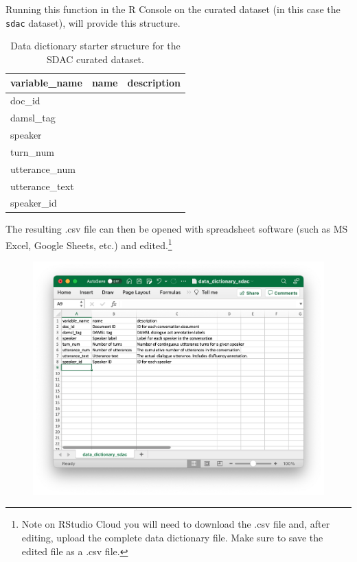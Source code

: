 \documentclass[
  letterpaper,
]{latex/krantz}
\begin{document}
Running this function in the R Console on the curated dataset (in this
case the \texttt{sdac} dataset), will provide this structure.

\hypertarget{tbl-cd-documentation-dic-starter-structure}{}
\begin{table}
\caption{\label{tbl-cd-documentation-dic-starter-structure}Data dictionary starter structure for the SDAC curated dataset. }\tabularnewline

\centering
\begin{tabular}{lll}
\toprule
variable\_name & name & description\\
\midrule
doc\_id &  & \\
damsl\_tag &  & \\
speaker &  & \\
turn\_num &  & \\
utterance\_num &  & \\
\addlinespace
utterance\_text &  & \\
speaker\_id &  & \\
\bottomrule
\end{tabular}
\end{table}

The resulting .csv file can then be opened with spreadsheet software
(such as MS Excel, Google Sheets, etc.) and edited.\footnote{Note on
  RStudio Cloud you will need to download the .csv file and, after
  editing, upload the complete data dictionary file. Make sure to save
  the edited file as a .csv file.}

\begin{figure}[h]

{\centering \includegraphics[width=5.31in,height=\textheight]{figures/curate-datasets/cd-data-dictionary.png}

}

\end{figure}
\end{document}
